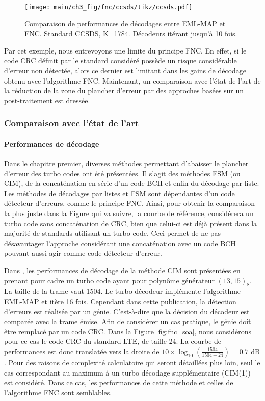 \begin{figure}[!b]
	\centering
	\texttt{[image: main/ch3\_fig/fnc/ccsds/tikz/ccsds.pdf]}
	\caption{Comparaison de performances de décodages entre EML-MAP et FNC. Standard CCSDS, K=1784.
	Décodeurs itérant jusqu'à 10 fois. \label{fig:fnc_ccsds}}
\end{figure}

Par cet exemple, nous entrevoyons une limite du principe FNC. En effet, si le code CRC définit par le standard considéré 
possède un risque considérable d'erreur non détectée, alors ce dernier est limitant dans les gains de décodage obtenu
avec l'algorithme FNC. Maintenant, un comparaison avec l'état de l'art de la réduction de la zone du plancher d'erreur 
par des approches basées sur un post-traitement est dressée.

\subsubsection{Comparaison avec l'état de l'art}
\paragraph*{Performances de décodage}
Dans le chapitre premier, diverses méthodes permettant d'abaisser le plancher d'erreur des turbo codes ont été présentées.
Il s'agit des méthodes FSM (ou CIM), de la concaténation en série d'un code BCH et enfin du décodage par liste. 
Les méthodes de décodages par listes et FSM sont dépendantes d'un code détecteur d'erreurs, comme le principe FNC. Ainsi, 
pour obtenir la comparaison la plus juste dans la Figure qui va suivre, la courbe de référence, considérera un turbo code 
sans concaténation de CRC, bien que celui-ci est déjà présent dans la majorité de standards utilisant un turbo code. 
Ceci permet de ne pas désavantager l'approche considérant une concaténation avec un code BCH pouvant aussi agir comme 
code détecteur d'erreur.

Dans \cite{cim}, les performances de décodage de la méthode CIM sont présentées en prenant pour cadre un turbo code ayant pour
polynôme générateur $(13,15)_8$. La taille de la trame vaut 1504. Le turbo décodeur implémente l'algorithme EML-MAP et
itère 16 fois. Cependant dans cette publication, la détection d'erreurs est réalisée par un génie. C'est-à-dire
que la décision du décodeur est comparée avec la trame émise. Afin de considérer un cas pratique, le génie doit être remplacé
par un code CRC. Dans la Figure \ref{fig:fnc_soa}, nous considérons pour ce cas le code CRC du standard LTE, de taille 24.
La courbe de performances est donc translatée vers la droite de $10\times\log_{10}\left(\frac{1504}{1504-24}\right)=0.7\text{ dB}$.
Pour des raisons de complexité calculatoire qui seront détaillées plus loin, seul le cas correspondant au maximum à un 
turbo décodage supplémentaire (CIM(1)) est considéré. Dans ce cas, les performances de cette méthode et celles de l'algorithme
FNC sont semblables.

